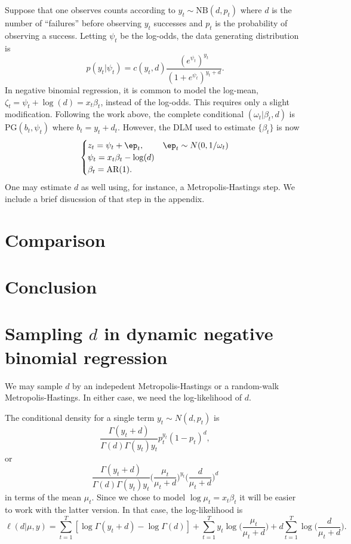 \documentclass[11pt]{article}
\newcommand{\PG}{\text{PG}}
\newcommand{\NB}{\text{NB}}
\begin{document}
Suppose that one observes counts according to $y_t \sim \NB(d, p_t)$ where $d$
is the number of ``failures'' before observing $y_t$ successes and $p_t$ is the
probability of observing a success.  Letting $\psi_t$ be the log-odds, the data
generating distribution is
\[
p(y_t | \psi_t) = c(y_t, d) \frac{(e^{\psi_t})^{y_t}}{(1+e^{\psi_t})^{y_t+d}}.
\]
In negative binomial regression, it is common to model the log-mean, $\zeta_t =
\psi_t + \log(d) = x_t \beta_t$, instead of the log-odds.  This requires only a
slight modification.  Following the work above, the complete conditional
$(\omega_t | \beta_t, d)$ is $\PG(b_t, \psi_t)$ where $b_t = y_t + d_t$.
However, the DLM used to estimate $\{\beta_t\}$ is now
\[
\begin{cases}
z_t = \psi_t + \ep_t, & \ep_t \sim N(0, 1/\omega_t) \\
\psi_t = x_t \beta_t - \log(d) \\
\beta_t = \text{AR}(1).
\end{cases}
\]
One may estimate $d$ as well using, for instance, a Metropolis-Hastings step.
We include a brief disucssion of that step in the appendix.

\section{Comparison}



\section{Conclusion}

\appendix

\section{Sampling $d$ in dynamic negative binomial regression}

We may sample $d$ by an indepedent Metropolis-Hastings or a random-walk
Metropolis-Hastings.  In either case, we need the log-likelihood of $d$.

The conditional density for a single term $y_t \sim N(d, p_t)$ is
\[
\frac{\Gamma(y_t + d)}{\Gamma(d) \Gamma(y_t) y_t} p_t^{y_t} (1-p_t)^{d} ,
\]
or 
\[
\frac{\Gamma(y_t + d)}{\Gamma(d) \Gamma(y_t) y_t} 
\Big( \frac{\mu_t}{\mu_t + d} \Big)^{y_t} \Big( \frac{d}{\mu_t + d} \Big)^d
\]
in terms of the mean $\mu_t$.  Since we chose to model $\log \mu_t = x_t
\beta_t$ it will be easier to work with the latter version.  In that case, the
log-likelihood is
\[
\ell(d|\mu, y) = \sum_{t=1}^T [ \log \Gamma(y_t + d)  - \log \Gamma(d) ]  + 
\sum_{t=1}^T y_t \log \big( \frac{\mu_t}{\mu_t + d} \Big) +
d \sum_{t=1}^T \log \Big( \frac{d}{\mu_t + d} \Big).
\]
\end{document}

